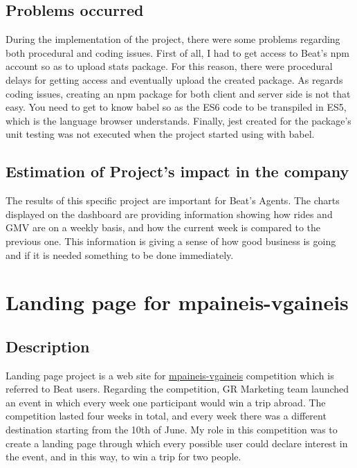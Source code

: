 \subsection{Problems occurred}

During the implementation of the project, there were some problems regarding both procedural and coding issues. First of all, I had to get access to Beat's npm account so as to upload stats package. For this reason, there were procedural delays for getting access and eventually upload the created package. As regards coding issues, creating an npm package for both client and server side is not that easy. You need to get to know babel so as the ES6 code to be transpiled in ES5, which is the language browser understands. Finally, jest created for the package's unit testing was not executed when the project started using with babel. \par

\subsection{Estimation of Project's impact in the company}

The results of this specific project are important for Beat's Agents. The charts displayed on the dashboard are providing information showing how rides and GMV are on a weekly basis, and how the current week is compared to the previous one. This information is giving a sense of how good business is going and if it is needed something to be done immediately.

\section{Landing page for mpaineis-vgaineis}

\subsection{Description}

Landing page project is a web site for \href{mpaineis-vgaineis.gr}{mpaineis-vgaineis} competition which is referred to Beat users. Regarding the competition, GR Marketing team launched an event in which every week one participant would win a trip abroad. The competition lasted four weeks in total, and every week there was a different destination starting from the 10th of June. My role in this competition was to create a landing page through which every possible user could declare interest in the event, and in this way, to win a trip for two people. \par

